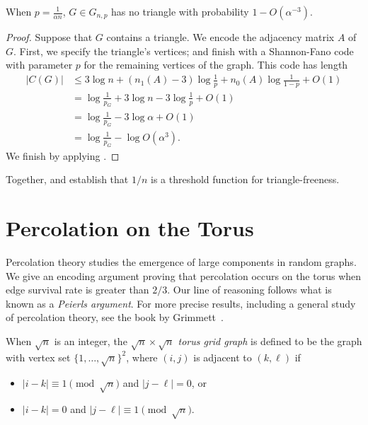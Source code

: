 \begin{thm}
  When $p = \frac{1}{\alpha n}$, $G \in G_{n, p}$ has no triangle
  with probability $1 - O(\alpha^{-3})$.
\end{thm}
\begin{proof}
  Suppose that $G$ contains a triangle. We encode the adjacency matrix
  $A$ of $G$. First, we specify the triangle's vertices; and finish
  with a Shannon-Fano code with parameter $p$ for the remaining
  vertices of the graph. This code has length
  \begin{align*}
    |C(G)| &\leq 3 \log n + (n_1(A) - 3) \log \frac{1}{p} + n_0(A) \log \frac{1}{1 - p} + O(1) \\
           &= \log \frac{1}{p_G} + 3 \log n - 3 \log \frac{1}{p} + O(1) \\
           &= \log \frac{1}{p_G} - 3 \log \alpha + O(1) \\
           &= \log \frac{1}{p_G} - \log O(\alpha^3).
  \end{align*}
  We finish by applying .
\end{proof}

Together,  and  establish
that $1/n$ is a threshold function for triangle-freeness.

\section{Percolation on the Torus}

Percolation theory studies the emergence of large components in random
graphs. We give an encoding argument proving that percolation occurs
on the torus when edge survival rate is greater than $2/3$. Our line
of reasoning follows what is known as a \emph{Peierls argument}. For
more precise results, including a general study of percolation theory,
see the book by Grimmett~\cite{grimmett:percolation}.

\begin{defn}
  When $\sqrt{n}$ is an integer, the \emph{$\sqrt{n} \times \sqrt{n}$
    torus grid graph} is defined to be the graph with vertex set
  $\{1, \ldots, \sqrt{n}\}^2$, where $(i, j)$ is adjacent to
  $(k, \ell)$ if
  \begin{itemize}
    \item $|i - k| \equiv 1 \pmod{\sqrt{n}}$ and $|j - \ell| = 0$, or
    \item $|i - k| = 0$ and $|j - \ell| \equiv 1 \pmod{\sqrt{n}}$.
    \end{itemize}
\end{defn}

